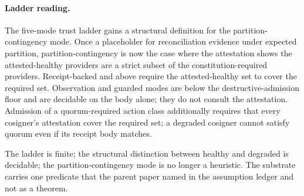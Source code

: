 \paragraph{Ladder reading.}
The five-mode trust ladder gains a structural definition for the partition-contingency mode. Once a placeholder for reconciliation evidence under expected partition, partition-contingency is now the case where the attestation shows the attested-healthy providers are a strict subset of the constitution-required providers. Receipt-backed and above require the attested-healthy set to cover the required set. Observation and guarded modes are below the destructive-admission floor and are decidable on the body alone; they do not consult the attestation. Admission of a quorum-required action class additionally requires that every cosigner's attestation cover the required set; a degraded cosigner cannot satisfy quorum even if its receipt body matches.

The ladder is finite; the structural distinction between healthy and degraded is decidable; the partition-contingency mode is no longer a heuristic. The substrate carries one predicate that the parent paper named in the assumption ledger and not as a theorem.

